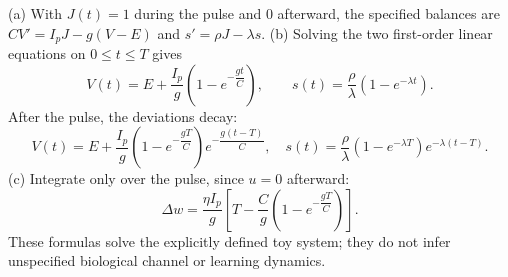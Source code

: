(a) With $ J(t)=1 $ during the pulse and 0 afterward, the specified balances are $ CV\prime=I_pJ-g(V-E)$ and $ s\prime=\rho J-\lambda s $. (b) Solving the two first-order linear equations on $ 0\le t\le T $ gives \[V(t)=E+\dfrac{I_p}{g}(1-e^{-\dfrac{gt}{C}}),\qquad s(t)=\dfrac{\rho}{\lambda}(1-e^{-\lambda t}).\]After the pulse, the deviations decay: \[V(t)=E+\dfrac{I_p}{g}(1-e^{-\dfrac{gT}{C}})e^{-\dfrac{g(t-T)}{C}},\quad s(t)=\dfrac{\rho}{\lambda}(1-e^{-\lambda T})e^{-\lambda(t-T)}.\](c) Integrate only over the pulse, since $ u=0 $ afterward: \[\boxed{\Delta w=\dfrac{\eta I_p}{g}\left[T-\dfrac{C}{g}(1-e^{-\dfrac{gT}{C}})\right]}.\]These formulas solve the explicitly defined toy system; they do not infer unspecified biological channel or learning dynamics.
